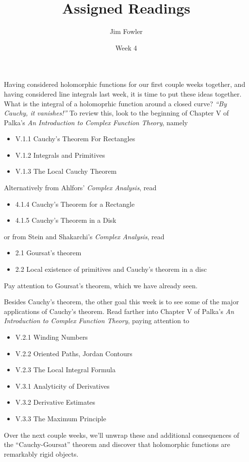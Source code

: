 \documentclass{homework}
\author{Jim Fowler}
\title{Assigned Readings}
\date{Week 4}
\begin{document}
\maketitle

Having considered holomorphic functions for our first couple weeks
together, and having considered line integrals last week, it is time
to put these ideas together.  What is the integral of a holomoprhic
function around a closed curve?  \textit{``By Cauchy, it vanishes!''}
To review this, look to the beginning of Chapter V of Palka's
\textit{An Introduction to Complex Function Theory}, namely
\begin{itemize}
\item V.1.1 Cauchy's Theorem For Rectangles
\item V.1.2 Integrals and Primitives
\item V.1.3 The Local Cauchy Theorem
\end{itemize}
Alternatively from Ahlfors' \textit{Complex Analysis}, read
\begin{itemize}
\item 4.1.4 Cauchy's Theorem for a Rectangle
\item 4.1.5 Cauchy's Theorem in a Disk
\end{itemize}
or from Stein and Shakarchi's \textit{Complex Analysis}, read
\begin{itemize}
\item 2.1 Goursat's theorem
\item 2.2 Local existence of primitives and Cauchy's theorem in a disc
\end{itemize}
Pay attention to Goursat's theorem, which we have already seen.

Besides Cauchy's theorem, the other goal this week is to see some of
the major applications of Cauchy's theorem.  Read farther into Chapter
V of Palka's \textit{An Introduction to Complex Function Theory},
paying attention to
\begin{itemize}
\item V.2.1 Winding Numbers
\item V.2.2 Oriented Paths, Jordan Contours
\item V.2.3 The Local Integral Formula
\item V.3.1 Analyticity of Derivatives
\item V.3.2 Derivative Estimates
\item V.3.3 The Maximum Principle
\end{itemize}
Over the next couple weeks, we'll unwrap these and additional
consequences of the ``Cauchy-Goursat'' theorem and discover that
holomorphic functions are remarkably rigid objects.
\end{document}
